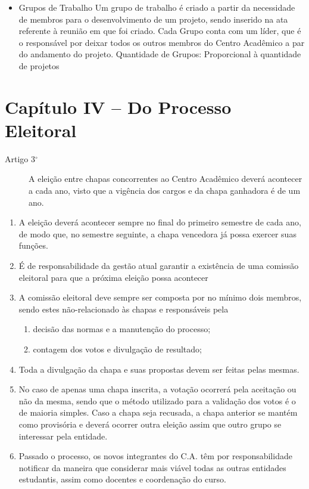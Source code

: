\documentclass[12pt]{article}
\begin{document}
\begin{itemize}
    \item Grupos de Trabalho
        \subitem Um grupo de trabalho é criado a partir da necessidade de
        membros para o desenvolvimento de um projeto, sendo inserido na ata
        referente à reunião em que foi criado. Cada Grupo conta com um
        líder, que é o responsável por deixar todos os outros membros do Centro
        Acadêmico a par do andamento do projeto.
        \subitem  Quantidade de Grupos: Proporcional à quantidade de projetos
\end{itemize}


\section{Capítulo IV -- Do Processo Eleitoral}
\begin{description}
    \item[Artigo 3$^\circ$] A eleição entre chapas concorrentes ao Centro
        Acadêmico deverá acontecer a cada ano, visto que a vigência dos cargos
        e da chapa ganhadora é de um ano.
\end{description}
\begin{enumerate}[label= \S\,\arabic*$^\circ$]
    \item A eleição deverá acontecer sempre no final do primeiro semestre de
        cada ano, de modo que, no semestre seguinte, a chapa vencedora já possa
        exercer suas funções.
    \item É de responsabilidade da gestão atual garantir a existência de uma
        comissão eleitoral para que a próxima eleição possa acontecer
    \item A comissão eleitoral deve sempre ser composta por no mínimo dois
        membros, sendo estes não-relacionado às chapas e responsáveis pela
        \begin{enumerate}[label=\alph*)]
            \item decisão das normas e a manutenção do processo;
            \item contagem dos votos e divulgação de resultado;
        \end{enumerate}
    \item Toda a divulgação da chapa e suas propostas devem ser feitas pelas
        mesmas.
    \item No caso de apenas uma chapa inscrita, a votação ocorrerá pela
        aceitação ou não da mesma, sendo que o método utilizado para a
        validação dos votos é o de maioria simples. Caso a chapa seja recusada,
        a chapa anterior se mantém como provisória e deverá ocorrer outra
        eleição assim que outro grupo se interessar pela entidade.
    \item Passado o processo, os novos integrantes do C.A. têm por
        responsabilidade notificar da maneira que considerar mais viável todas as outras entidades estudantis, assim
        como docentes e coordenação do curso.
\end{enumerate}
\end{document}
